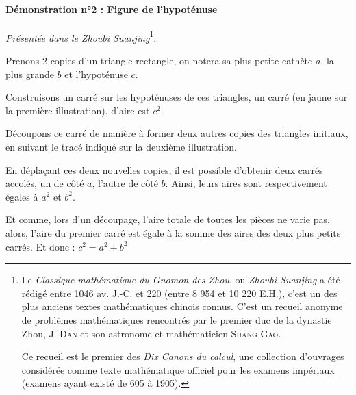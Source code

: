\documentclass[a4paper, twoside]{article}
\begin{document}
\newpage

\paragraph*{Démonstration n°2 : Figure de l'hypoténuse}

\textit{Présentée dans le Zhoubi Suanjing}\footnote{
	Le \textit{Classique mathématique du Gnomon des Zhou}, ou \textit{Zhoubi Suanjing} 
	a été rédigé entre 1046 av. J.-C. et 220 (entre 8 954 et 10 220 E.H.),
	c'est un des plus anciens textes mathématiques chinois connus.
	C'est un recueil anonyme de problèmes mathématiques rencontrés 
	par le premier duc de la dynastie Zhou, \textsc{Ji Dan} et 
	son astronome et mathématicien \textsc{Shang Gao}.
	
	Ce recueil est le premier des \textit{Dix Canons du calcul}, 
	une collection d'ouvrages considérée comme texte 
	mathématique officiel pour les examens impériaux 
(examens ayant existé de 605 à 1905).}.

Prenons 2 copies d'un triangle rectangle, 
on notera sa plus petite cathète $a$, la plus grande $b$ et l'hypoténuse $c$.

Construisons un carré sur les hypoténuses de ces triangles, 
un carré (en jaune sur la première illustration), d'aire est $c^2$.

Découpons ce carré de manière à former deux autres copies des triangles initiaux,
en suivant le tracé indiqué sur la deuxième illustration.

En déplaçant ces deux nouvelles copies,
il est possible d'obtenir deux carrés accolés, un de côté $a$, l'autre de côté $b$.
Ainsi, leurs aires sont respectivement égales à $a^2$ et $b^2$.

Et comme, lors d'un découpage, l'aire totale de toutes les pièces ne varie pas,
alors, l'aire du premier carré est égale à la somme des aires des deux plus petits carrés.
Et donc : $c^2 = a^2 + b^2$
\end{document}
